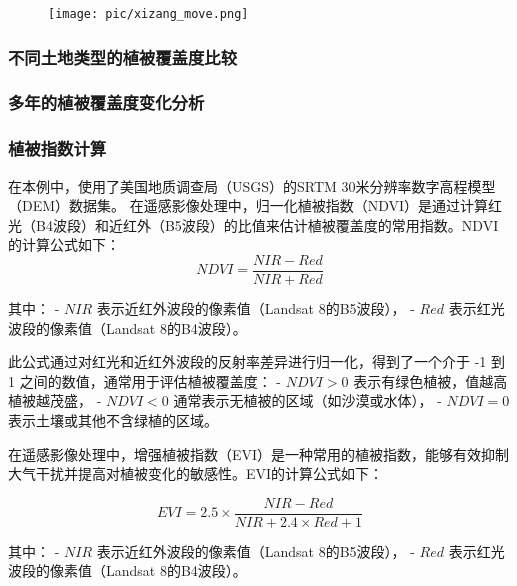 \documentclass{article}
\begin{document}
				
		\begin{figure}[H]  %
			\centering
			\texttt{[image: pic/xizang\_move.png]} %
		\end{figure}
		
		
		\subsubsection{不同土地类型的植被覆盖度比较}

		
		
		\subsubsection{多年的植被覆盖度变化分析}
		
		
		
		
		
		
		
		\subsubsection{植被指数计算}
		
				
		在本例中，使用了美国地质调查局（USGS）的SRTM 30米分辨率数字高程模型（DEM）数据集。
		在遥感影像处理中，归一化植被指数（NDVI）是通过计算红光（B4波段）和近红外（B5波段）的比值来估计植被覆盖度的常用指数。NDVI的计算公式如下：
		\[
		NDVI = \frac{NIR - Red}{NIR + Red}
		\]
		
		其中：
		- \( NIR \) 表示近红外波段的像素值（Landsat 8的B5波段），
		- \( Red \) 表示红光波段的像素值（Landsat 8的B4波段）。
		
		此公式通过对红光和近红外波段的反射率差异进行归一化，得到了一个介于 -1 到 1 之间的数值，通常用于评估植被覆盖度：
		- \( NDVI > 0 \) 表示有绿色植被，值越高植被越茂盛，
		- \( NDVI < 0 \) 通常表示无植被的区域（如沙漠或水体），
		- \( NDVI = 0 \) 表示土壤或其他不含绿植的区域。
		
		在遥感影像处理中，增强植被指数（EVI）是一种常用的植被指数，能够有效抑制大气干扰并提高对植被变化的敏感性。EVI的计算公式如下：
		
		\[
		EVI = 2.5 \times \frac{NIR - Red}{NIR + 2.4 \times Red + 1}
		\]
		
		其中：
		- \( NIR \) 表示近红外波段的像素值（Landsat 8的B5波段），
		- \( Red \) 表示红光波段的像素值（Landsat 8的B4波段）。
		
\end{document}
